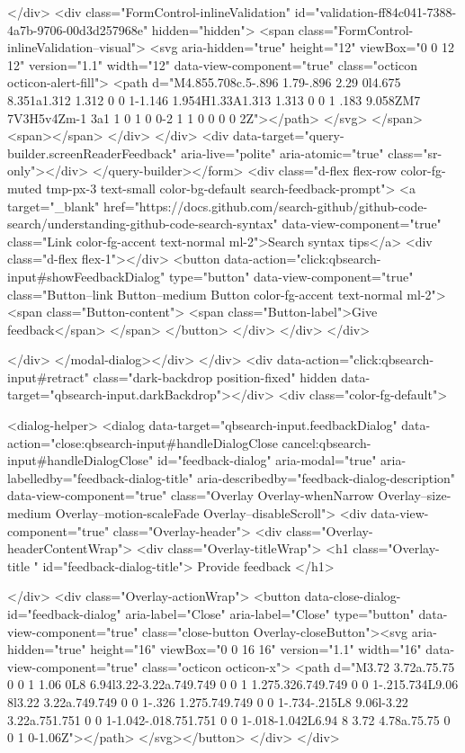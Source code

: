 {{        </div>
      <div class="FormControl-inlineValidation" id="validation-ff84c041-7388-4a7b-9706-00d3d257968e" hidden="hidden">
        <span class="FormControl-inlineValidation--visual">
          <svg aria-hidden="true" height="12" viewBox="0 0 12 12" version="1.1" width="12" data-view-component="true" class="octicon octicon-alert-fill">
    <path d="M4.855.708c.5-.896 1.79-.896 2.29 0l4.675 8.351a1.312 1.312 0 0 1-1.146 1.954H1.33A1.313 1.313 0 0 1 .183 9.058ZM7 7V3H5v4Zm-1 3a1 1 0 1 0 0-2 1 1 0 0 0 0 2Z"></path>
</svg>
        </span>
        <span></span>
</div>    </div>
    <div data-target="query-builder.screenReaderFeedback" aria-live="polite" aria-atomic="true" class="sr-only"></div>
</query-builder></form>
          <div class="d-flex flex-row color-fg-muted tmp-px-3 text-small color-bg-default search-feedback-prompt">
            <a target="_blank" href="https://docs.github.com/search-github/github-code-search/understanding-github-code-search-syntax" data-view-component="true" class="Link color-fg-accent text-normal ml-2">Search syntax tips</a>            <div class="d-flex flex-1"></div>
              <button data-action="click:qbsearch-input#showFeedbackDialog" type="button" data-view-component="true" class="Button--link Button--medium Button color-fg-accent text-normal ml-2">  <span class="Button-content">
    <span class="Button-label">Give feedback</span>
  </span>
</button>
          </div>
        </div>
</div>

    </div>
</modal-dialog></div>
  </div>
  <div data-action="click:qbsearch-input#retract" class="dark-backdrop position-fixed" hidden data-target="qbsearch-input.darkBackdrop"></div>
  <div class="color-fg-default">
    
<dialog-helper>
  <dialog data-target="qbsearch-input.feedbackDialog" data-action="close:qbsearch-input#handleDialogClose cancel:qbsearch-input#handleDialogClose" id="feedback-dialog" aria-modal="true" aria-labelledby="feedback-dialog-title" aria-describedby="feedback-dialog-description" data-view-component="true" class="Overlay Overlay-whenNarrow Overlay--size-medium Overlay--motion-scaleFade Overlay--disableScroll">
    <div data-view-component="true" class="Overlay-header">
  <div class="Overlay-headerContentWrap">
    <div class="Overlay-titleWrap">
      <h1 class="Overlay-title " id="feedback-dialog-title">
        Provide feedback
      </h1>
        
    </div>
    <div class="Overlay-actionWrap">
      <button data-close-dialog-id="feedback-dialog" aria-label="Close" aria-label="Close" type="button" data-view-component="true" class="close-button Overlay-closeButton"><svg aria-hidden="true" height="16" viewBox="0 0 16 16" version="1.1" width="16" data-view-component="true" class="octicon octicon-x">
    <path d="M3.72 3.72a.75.75 0 0 1 1.06 0L8 6.94l3.22-3.22a.749.749 0 0 1 1.275.326.749.749 0 0 1-.215.734L9.06 8l3.22 3.22a.749.749 0 0 1-.326 1.275.749.749 0 0 1-.734-.215L8 9.06l-3.22 3.22a.751.751 0 0 1-1.042-.018.751.751 0 0 1-.018-1.042L6.94 8 3.72 4.78a.75.75 0 0 1 0-1.06Z"></path>
</svg></button>
    </div>
  </div>
  
}}
